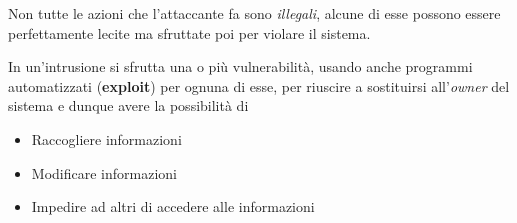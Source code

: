 Non tutte le azioni che l'attaccante fa sono \emph{illegali}, alcune di esse possono essere perfettamente lecite ma
sfruttate poi per violare il sistema.

In un'intrusione si sfrutta una o più vulnerabilità, usando anche programmi automatizzati (\textbf{exploit}) per ognuna
di esse, per riuscire a sostituirsi all'\emph{owner} del sistema e dunque avere la possibilità di
\begin{itemize}
	\item Raccogliere informazioni
	\item Modificare informazioni
	\item Impedire ad altri di accedere alle informazioni
\end{itemize}
